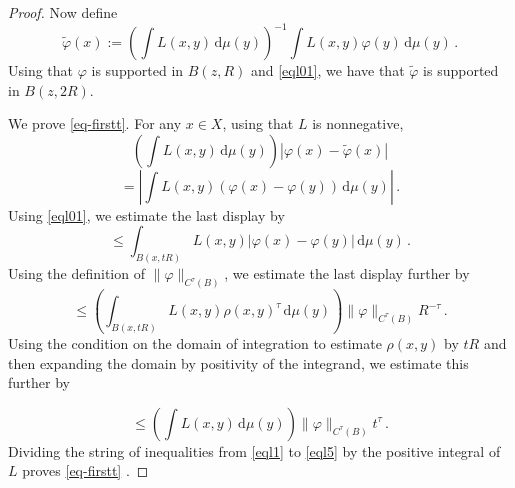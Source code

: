 {\begin{proof}
Now define
    $$
        \tilde \varphi(x) := \left(\int L(x,y) \, \mathrm{d}\mu(y)\right)^{-1}\int L(x,y) \varphi(y) \, \mathrm{d}\mu(y)\, .
    $$
Using that $\varphi$ is supported in $B(z,R)$ and
\eqref{eql01}, we have that $\tilde{\varphi}$ is supported in $B(z,2R)$.

We prove \eqref{eq-firstt}.
 For any $x\in X$, using
    that $L$ is nonnegative,
    \begin{equation}\label{eql1}
    \left(\int L(x,y) \, \mathrm{d}\mu(y)\right)
        |\varphi(x) - \tilde \varphi(x)|
    \end{equation}
 \begin{equation}\label{eql2}
 = \left| \int L(x,y)(\varphi(x) - \varphi(y)) \, \mathrm{d}\mu(y)\right|\, .
    \end{equation}
Using \eqref{eql01}, we estimate the last display by
 \begin{equation}\label{eql3}
         \le   \int_{B(x, tR)} L(x,y)|\varphi(x) - \varphi(y)| \, \mathrm{d}\mu(y)\, .\end{equation}
  Using the definition of $\|\varphi\|_{C^\tau(B)}$, we estimate the last display further by
        \begin{equation}\label{eql4}
         \le   \left(\int_{B(x, tR)} L(x,y)
          \rho(x,y)^\tau \, \mathrm{d}\mu(y) \right)\|\varphi\|_{C^\tau(B)}R^{-\tau}\, .
    \end{equation}
  Using the condition on the domain of integration to estimate $\rho(x,y)$ by $tR$ and then expanding the domain by positivity of the integrand, we estimate this further by

    \begin{equation}\label{eql5}
         \le   \left(\int L(x,y) \, \mathrm{d}\mu(y)\right)
         \|\varphi\|_{C^\tau(B)} t^{\tau} \, .
    \end{equation}
 Dividing the string of inequalities from \eqref{eql1} to
\eqref{eql5} by the positive integral of $L$ proves \eqref{eq-firstt} .



\end{proof}}
